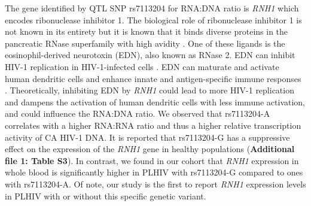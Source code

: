 \documentclass{book}
\begin{document}
\begin{refsection}
The gene identified by QTL SNP rs7113204 for RNA:DNA ratio is \textit{RNH1} which encodes ribonuclease inhibitor 1.
The biological role of ribonuclease inhibitor 1 is not known in its entirety but it is known that it binds diverse proteins in the pancreatic RNase superfamily with high avidity \cite{Shapiro2001Cytoplasmic}.
One of these ligands is the eosinophil-derived neurotoxin (EDN), also known as RNase 2.
EDN can inhibit HIV-1 replication in HIV-1-infected cells \cite{Lee1999Lysozyme,Rugeles2003Ribonuclease}.
EDN can maturate and activate human dendritic cells and enhance innate and antigen-specific immune responses \cite{Yang2004Human}.
Theoretically, inhibiting EDN by \textit{RNH1} could lead to more HIV-1 replication and dampens the activation of human dendritic cells with less immune activation, and could influence the RNA:DNA ratio.
We observed that rs7113204-A correlates with a higher RNA:RNA ratio and thus a higher relative transcription activity of CA HIV-1 DNA.
It is reported that rs7113204-G has a suppressive effect on the expression of the \textit{RNH1} gene in healthy populations \cite{Võsa2018Unraveling} (\textbf{Additional file 1: Table S3}).
In contrast, we found in our cohort that \textit{RNH1} expression in whole blood is significantly higher in PLHIV with rs7113204-G compared to ones with rs7113204-A.
Of note, our study is the first to report \textit{RNH1} expression levels in PLHIV with or without this specific genetic variant.


\end{refsection}
\end{document}

